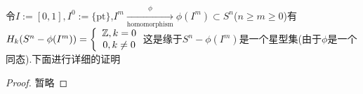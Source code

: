 \documentclass{article}
\begin{document}
        \begin{example}
            令$I := [0,1],I^0 := \{\text{pt}\}$,$I^m\xrightarrow[\text{homomorphism}]{\phi}\phi(I^m)\subset S^n$($n \geq m \geq 0$)有$H_k(S^n - \phi(I^m)) = \left\{\begin{array}{c}\mathbb{Z} , k = 0 \\0 , k \neq 0 \\\end{array}\right.$这是缘于$S^n - \phi(I^m)$是一个星型集(由于$\phi$是一个同态).下面进行详细的证明
            \begin{proof}
                暂略
            \end{proof}
        \end{example}
\newpage


\end{document}

